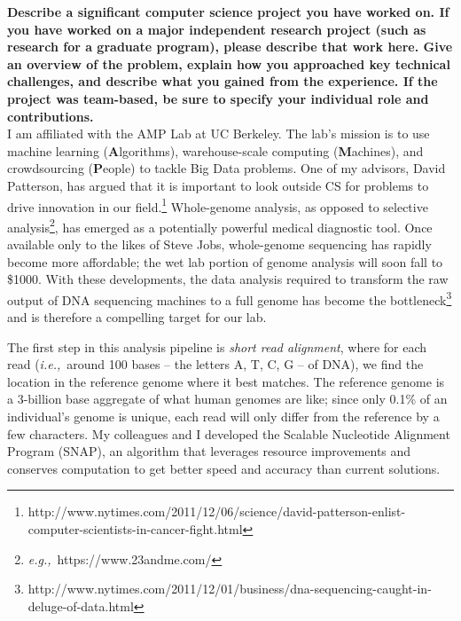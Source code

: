 \documentclass{article}
\newcommand{\ie}{{\em i.e.,}~}
\newcommand{\eg}{{\em e.g.,}~}
\begin{document}
	
\pagestyle{plain}

\textbf{Describe a significant computer science project you have worked on. If you have worked on a major independent research project (such as research for a graduate program), please describe that work here. Give an overview of the problem, explain how you approached key technical challenges, and describe what you gained from the experience. If the project was team-based, be sure to specify your individual role and contributions.}\\

I am affiliated with the AMP Lab at UC Berkeley.
The lab's mission is to use machine learning (\textbf{A}lgorithms), warehouse-scale computing (\textbf{M}achines), and crowdsourcing (\textbf{P}eople) to tackle Big Data problems.
One of my advisors, David Patterson, has argued that it is important to look outside CS for problems to drive innovation in our field.\footnote{http://www.nytimes.com/2011/12/06/science/david-patterson-enlist-computer-scientists-in-cancer-fight.html} %
Whole-genome analysis, as opposed to selective analysis\footnote{\eg https://www.23andme.com/}, has emerged as a potentially powerful medical diagnostic tool.
Once available only to the likes of Steve Jobs, whole-genome sequencing has rapidly become more affordable; the wet lab portion of genome analysis will soon fall to \$1000. %
With these developments, the data analysis required to transform the raw output of DNA sequencing machines to a full genome has become the bottleneck\footnote{http://www.nytimes.com/2011/12/01/business/dna-sequencing-caught-in-deluge-of-data.html} and is therefore a compelling target for our lab.

The first step in this analysis pipeline is \textit{short read alignment}, where for each read (\ie around 100 bases -- the letters A, T, C, G -- of DNA), we find the location in the reference genome where it best matches.
The reference genome is a 3-billion base aggregate of what human genomes are like; since only 0.1\% of an individual's genome is unique, each read will only differ from the reference by a few characters.
My colleagues and I developed the Scalable Nucleotide Alignment Program (SNAP), an algorithm that leverages resource improvements and conserves computation to get better speed and accuracy than current solutions.
\end{document}

